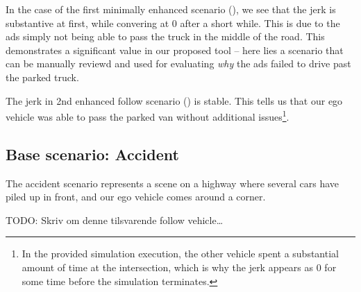 In the case of the first minimally enhanced scenario (), we
see that the jerk is substantive at first, while convering at \num{0} after a short while. This is
due to the \acrshort{ads} simply not being able to pass the truck in the middle of the road. This
demonstrates a significant value in our proposed tool -- here lies a scenario that can be manually
reviewd and used for evaluating \emph{why} the \acrshort{ads} failed to drive past the parked truck.

The jerk in 2nd enhanced follow scenario () is stable. This
tells us that our ego vehicle was able to pass the parked van without additional issues\footnote{In
    the provided simulation execution, the other vehicle spent a substantial amount of time at the
    intersection, which is why the jerk appears as \num{0} for some time before the simulation
    terminates.}.

\subsection{Base scenario: Accident}

The accident scenario represents a scene on a highway where several cars have piled up in front, and
our ego vehicle comes around a corner.

TODO: Skriv om denne tilsvarende follow vehicle\ldots